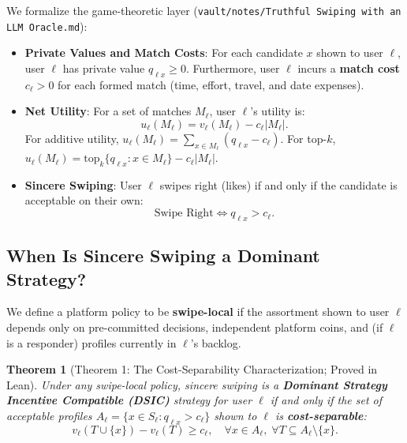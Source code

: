 \documentclass[11pt,letterpaper]{article}
\theoremstyle{definition}
\theoremstyle{plain}
\newtheorem{theorem}{Theorem}[section]
\theoremstyle{remark}
\begin{document}
We formalize the game-theoretic layer (\texttt{vault/notes/Truthful Swiping with an LLM Oracle.md}):
\begin{itemize}[leftmargin=2em]
    \item \textbf{Private Values and Match Costs}: For each candidate $x$ shown to user $\ell$, user $\ell$ has private value $q_{\ell x} \ge 0$. Furthermore, user $\ell$ incurs a \textbf{match cost} $c_\ell > 0$ for each formed match (time, effort, travel, and date expenses).
    \item \textbf{Net Utility}: For a set of matches $M_\ell$, user $\ell$'s utility is:
    \begin{equation}
        u_\ell(M_\ell) = v_\ell(M_\ell) - c_\ell |M_\ell|.
    \end{equation}
    For additive utility, $u_\ell(M_\ell) = \sum_{x \in M_\ell} (q_{\ell x} - c_\ell)$. For top-$k$, $u_\ell(M_\ell) = \mathrm{top}_k\{q_{\ell x} : x \in M_\ell\} - c_\ell |M_\ell|$.
    \item \textbf{Sincere Swiping}: User $\ell$ swipes right (likes) if and only if the candidate is acceptable on their own:
    \begin{equation}
        \text{Swipe Right} \iff q_{\ell x} > c_\ell.
    \end{equation}
\end{itemize}

\subsection{When Is Sincere Swiping a Dominant Strategy?}
We define a platform policy to be \textbf{swipe-local} if the assortment shown to user $\ell$ depends only on pre-committed decisions, independent platform coins, and (if $\ell$ is a responder) profiles currently in $\ell$'s backlog.

\begin{theorem}[Theorem 1: The Cost-Separability Characterization; Proved in Lean]
Under any swipe-local policy, sincere swiping is a \textbf{Dominant Strategy Incentive Compatible (DSIC)} strategy for user $\ell$ if and only if the set of acceptable profiles $A_\ell = \{x \in S_\ell : q_{\ell x} > c_\ell\}$ shown to $\ell$ is \textbf{cost-separable}:
\begin{equation}
    v_\ell(T \cup \{x\}) - v_\ell(T) \ge c_\ell, \quad \forall x \in A_\ell, \; \forall T \subseteq A_\ell \setminus \{x\}.
\end{equation}
\end{theorem}
\end{document}
